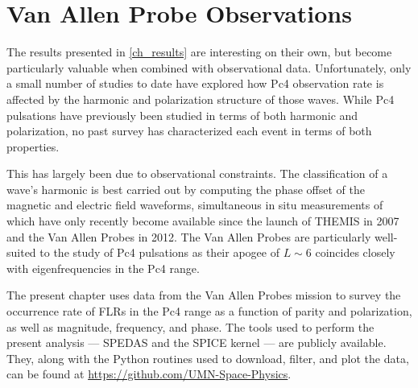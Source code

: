 


\chapter{Van Allen Probe Observations}
  \label{ch_rbsp}

The results presented in \cref{ch_results} are interesting on their own, but
become particularly valuable when combined with observational data.
Unfortunately, only a small number of studies to date have explored how Pc4
observation rate is affected by the harmonic and polarization structure of
those waves. While Pc4 pulsations have previously been studied in terms of both
harmonic\cite{arthur_1981,cummings_1969,engebretson_1988,hughes_1978,
singer_1982,takahashi_1984} and 
polarization\cite{anderson_1990,dai_2015,dai_2013,kokubun_1989,liu_2009}, no
past survey has characterized each event in terms of both properties. 

This has largely been due to observational constraints. The classification of a
wave's harmonic is best carried out by computing the phase offset of the
magnetic and electric field waveforms, simultaneous in situ measurements of
which have only recently become available since the launch of
THEMIS\cite{angelopoulos_2008} in 2007 and the Van Allen
Probes\cite{stratton_2012} in 2012. The Van Allen Probes are particularly
well-suited to the study of Pc4 pulsations as their apogee of $L \sim 6$
coincides closely with eigenfrequencies in the Pc4 range. 

The present chapter uses data from the Van Allen Probes mission to survey the
occurrence rate of FLRs in the Pc4 range as a function of parity and
polarization, as well as magnitude, frequency, and phase. The tools used to
perform the present analysis --- SPEDAS and the SPICE kernel --- are publicly
available. They, along with the Python routines used to download, filter, and
plot the data, can be found at \url{https://github.com/UMN-Space-Physics}. 




